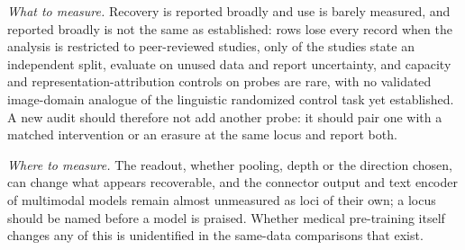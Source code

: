 \emph{What to measure.} Recovery is reported broadly and use is barely measured, and reported broadly is
not the same as established: \Fsensrefemptyn{} rows lose every record when the analysis is restricted
to peer-reviewed studies, only \Nminvalid{} of the \Ncore{} studies state an independent split, evaluate
on unused data and report uncertainty, and capacity and representation-attribution controls on probes
are rare, with no validated image-domain analogue of the linguistic randomized control task yet
established. A new audit should therefore not add another probe: it should pair one with a
matched intervention or an erasure at the same locus and report both.

\emph{Where to measure.} The readout, whether pooling, depth or the direction chosen, can change what
appears recoverable, and the connector output and text encoder of multimodal models remain almost
unmeasured as loci of their own; a locus should be named before a model is praised. Whether medical
pre-training itself changes any of this is unidentified in the same-data comparisons that exist.
